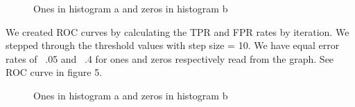\documentclass[12pt]{report}
\begin{document}
\begin{figure}
\centering
{}
\caption{Ones in histogram a and zeros in histogram b}
\end{figure}


We created ROC curves  by calculating the TPR and FPR rates by iteration. We stepped through the threshold values with step size = 10. We have equal error rates of ~.05 and ~.4 for ones and zeros respectively read from the graph. See ROC curve in figure 5.

\begin{figure}
\centering
{}
\caption{Ones in histogram a and zeros in histogram b}
\end{figure}
\end{document}
